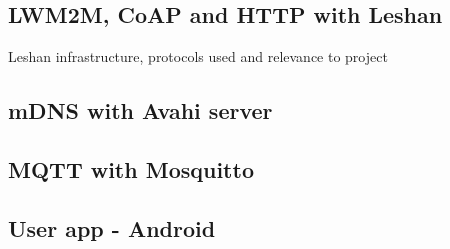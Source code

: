 \documentclass[conference]{IEEEtran}
\begin{document}
\subsection{LWM2M, CoAP and HTTP with Leshan}
Leshan infrastructure, protocols used and relevance to project

\subsection{mDNS with Avahi server}
\subsection{MQTT with Mosquitto}
\subsection{User app - Android}
\end{document}
